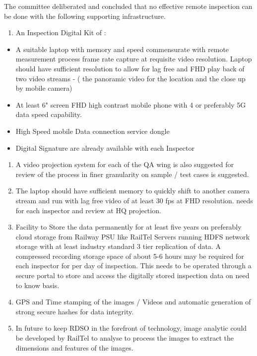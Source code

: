 \documentclass[
]{article}
\providecommand{\tightlist}{%
  \setlength{\itemsep}{0pt}\setlength{\parskip}{0pt}}
\begin{document}
The committee deliberated and concluded that no effective remote
inspection can be done with the following supporting infrastructure.

\begin{enumerate}
\def\labelenumi{\arabic{enumi}.}
\tightlist
\item
  An Inspection Digital Kit of :
\end{enumerate}

\begin{itemize}
\tightlist
\item
  A suitable laptop with memory and speed commensurate with remote
  measurement process frame rate capture at requisite video resolution.
  Laptop should have sufficient resolution to allow for lag free and FHD
  play back of two video streams - ( the panoramic video for the
  location and the close up by mobile camera)
\item
  At least 6" screen FHD high contrast mobile phone with 4 or preferably
  5G data speed capability.
\item
  High Speed mobile Data connection service dongle
\item
  Digital Signature are already available with each Inspector
\end{itemize}

\begin{enumerate}
\def\labelenumi{\arabic{enumi}.}
\setcounter{enumi}{1}
\item
  A video projection system for each of the QA wing is also suggested
  for review of the process in finer granularity on sample / test cases
  is suggested.
\item
  The laptop should have sufficient memory to quickly shift to another
  camera stream and run with lag free video of at least 30 fps at FHD
  resolution. needs for each inspector and review at HQ projection.
\item
  Facility to Store the data permanently for at least five years on
  preferably cloud storage from Railway PSU like RailTel Servers running
  HDFS network storage with at least industry standard 3 tier
  replication of data. A compressed recording storage space of about 5-6
  hours may be required for each inspector for per day of inspection.
  This needs to be operated through a secure portal to store and access
  the digitally stored inspection data on need to know basis.
\item
  GPS and Time stamping of the images / Videos and automatic generation
  of strong secure hashes for data integrity.
\item
  In future to keep RDSO in the forefront of technology, image analytic
  could be developed by RailTel to analyse to process the images to
  extract the dimensions and features of the images.
\end{enumerate}
\end{document}
